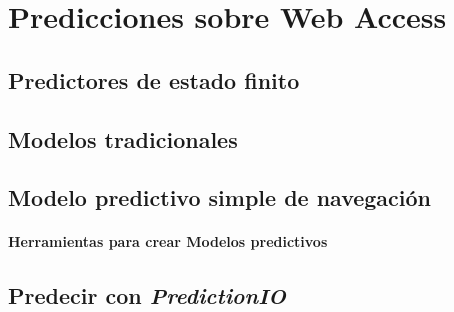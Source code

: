 \chapter[Predicciones sobre Web Access]{Predicciones sobre Web Access}\label{ch:predicciones-webaccess}




 




\section{Predictores de estado finito}
	

\section{Modelos tradicionales}
	


\section{Modelo predictivo simple de navegación }
	

	




\subsubsection{Herramientas para crear Modelos predictivos}

\section{Predecir con \emph{PredictionIO}}



